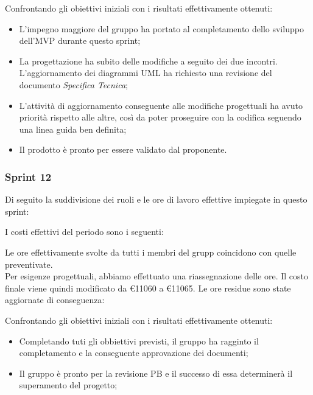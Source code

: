 

Confrontando gli obiettivi iniziali con i risultati effettivamente ottenuti:
\begin{itemize}
    \item L’impegno maggiore del gruppo ha portato al completamento dello sviluppo dell’MVP durante questo sprint;
    \item La progettazione ha subito delle modifiche a seguito dei due incontri. L’aggiornamento dei diagrammi UML ha richiesto una revisione del documento \textit{Specifica Tecnica};
    \item L’attività di aggiornamento conseguente alle modifiche progettuali ha avuto priorità rispetto alle altre, così da poter proseguire con la codifica seguendo una linea guida ben definita;
    \item Il prodotto è pronto per essere validato dal proponente.
\end{itemize}


\subsubsection{Sprint 12}

Di seguito la suddivisione dei ruoli e le ore di lavoro effettive impiegate in questo sprint:



I costi effettivi del periodo sono i seguenti:



Le ore effettivamente svolte da tutti i membri del grupp coincidono con quelle preventivate.\\
Per esigenze progettuali, abbiamo effettuato una riassegnazione delle ore. Il costo finale viene quindi modificato 
da \euro11060 a \euro11065. Le ore residue sono state aggiornate di conseguenza:



Confrontando gli obiettivi iniziali con i risultati effettivamente ottenuti:
\begin{itemize}
    \item Completando tuti gli obbiettivi previsti, il gruppo ha ragginto il completamento e la conseguente approvazione dei documenti;
    \item Il gruppo è pronto per la revisione PB e il successo di essa determinerà il superamento del progetto;
\end{itemize}

